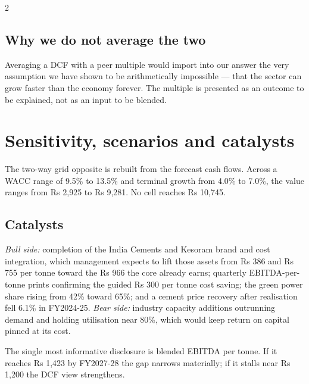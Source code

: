 \begin{paracol}{2}
\subsection{Why we do not average the two}

Averaging a DCF with a peer multiple would import into our answer the very assumption
we have shown to be arithmetically impossible — that the sector can grow faster than
the economy forever. The multiple is presented as an outcome to be explained, not as
an input to be blended.

\section{Sensitivity, scenarios and catalysts}

The two-way grid opposite is rebuilt from the forecast cash flows. Across a WACC range
of 9.5\% to 13.5\% and terminal growth from 4.0\% to 7.0\%, the value ranges from
Rs 2,925 to Rs 9,281. No cell reaches Rs 10,745.

\subsection{Catalysts}

\emph{Bull side:} completion of the India Cements and Kesoram brand and cost
integration, which management expects to lift those assets from Rs 386 and Rs 755 per
tonne toward the Rs 966 the core already earns; quarterly EBITDA-per-tonne prints
confirming the guided Rs 300 per tonne cost saving; the green power share rising from
42\% toward 65\%; and a cement price recovery after realisation fell 6.1\% in
FY2024-25. \emph{Bear side:} industry capacity additions outrunning demand and holding
utilisation near 80\%, which would keep return on capital pinned at its cost.

The single most informative disclosure is blended EBITDA per tonne. If it reaches
Rs 1,423 by FY2027-28 the gap narrows materially; if it stalls near Rs 1,200 the DCF
view strengthens.

\switchcolumn
{}



\end{paracol}
